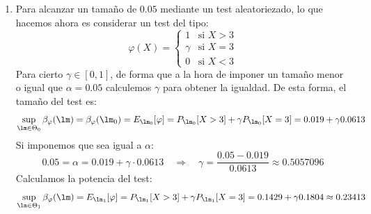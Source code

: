 \begin{ejercicio}
\begin{enumerate}[label=\alph*)]
        \item Para alcanzar un tamaño de $0.05$ mediante un test aleatoriezado, lo que hacemos ahora es considerar un test del tipo:
            \begin{equation*}
                \varphi(X) = \left\{\begin{array}{ll}
                    1 & \text{si\ } X>3 \\
                    \gamma & \text{si\ } X=3 \\
                    0 & \text{si\ } X<3 
                \end{array}\right. 
            \end{equation*}
            Para cierto $\gamma\in [0,1]$, de forma que a la hora de imponer un tamaño menor o igual que $\alpha=0.05$ calculemos $\gamma$ para obtener la igualdad. De esta forma, el tamaño del test es:
            \begin{equation*}
                \sup_{\lm \in \Theta_0}\beta_\varphi(\lm) = \beta_\varphi(\lm_0) = E_{\lm_0}[\varphi] = P_{\lm_0}[X>3] + \gamma P_{\lm_0}[X=3] = 0.019 + \gamma 0.0613
            \end{equation*}
            Si imponemos que sea igual a $\alpha$:
            \begin{equation*}
                0.05 = \alpha = 0.019 + \gamma \cdot 0.0613 \quad\Longrightarrow\quad \gamma = \frac{0.05 - 0.019}{0.0613} \approx 0.5057096
            \end{equation*}
            Calculamos la potencia del test:
            \begin{equation*}
                \sup_{\lm \in \Theta_1}\beta_\varphi(\lm) = E_{\lm_1}[\varphi] = P_{\lm_1}[X>3] + \gamma P_{\lm_1}[X=3] = 0.1429 + \gamma 0.1804 \approx 0.23413
            \end{equation*}
    \end{enumerate}
\end{ejercicio}

